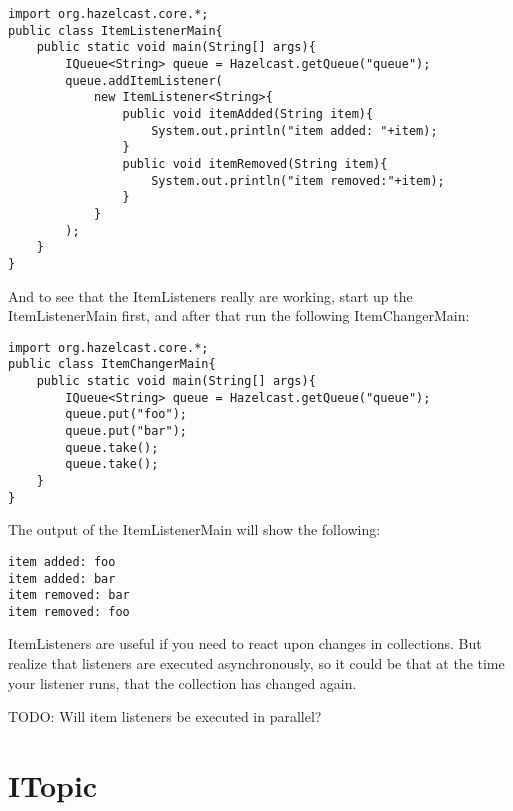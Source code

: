 \begin{verbatim}
import org.hazelcast.core.*;	
public class ItemListenerMain{
    public static void main(String[] args){
        IQueue<String> queue = Hazelcast.getQueue("queue");
        queue.addItemListener(
            new ItemListener<String>{
                public void itemAdded(String item){
                    System.out.println("item added: "+item);
                }
                public void itemRemoved(String item){ 
                    System.out.println("item removed:"+item);
                }
            }
        );
    }
}
\end{verbatim}

And to see that the ItemListeners really are working, start up the ItemListenerMain
first, and after that run the following ItemChangerMain:

\begin{verbatim}
import org.hazelcast.core.*;	
public class ItemChangerMain{
    public static void main(String[] args){
        IQueue<String> queue = Hazelcast.getQueue("queue");
        queue.put("foo");
        queue.put("bar");
        queue.take();
        queue.take();
    }
}
\end{verbatim}

The output of the ItemListenerMain will show the following:
\begin{verbatim}
item added: foo
item added: bar
item removed: bar
item removed: foo
\end{verbatim}

ItemListeners are useful if you need to react upon changes in collections. But realize that listeners 
are executed asynchronously, so it could be that at the time your listener runs, that the collection 
has changed again.

TODO: Will item listeners be executed in parallel?

\section{ITopic}

